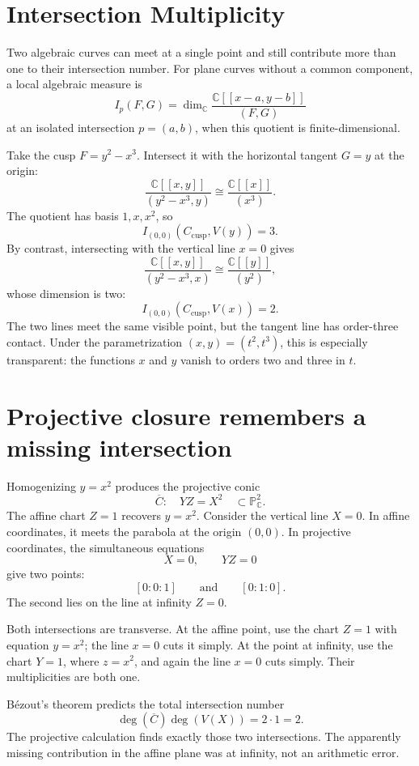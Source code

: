 \section{Intersection Multiplicity}

Two algebraic curves can meet at a single point and still contribute more than one to their intersection number. For plane curves without a common component, a local algebraic measure is
\[
 I_p(F,G)=\dim_{\mathbb C}
 \frac{\mathbb C[[x-a,y-b]]}{(F,G)}
\]
at an isolated intersection \(p=(a,b)\), when this quotient is finite-dimensional.

Take the cusp \(F=y^2-x^3\). Intersect it with the horizontal tangent \(G=y\) at the origin:
\[
 \frac{\mathbb C[[x,y]]}{(y^2-x^3,y)}
 \cong\frac{\mathbb C[[x]]}{(x^3)}.
\]
The quotient has basis \(1,x,x^2\), so
\[
 \boxed{I_{(0,0)}(C_{\mathrm{cusp}},V(y))=3.}
\]
By contrast, intersecting with the vertical line \(x=0\) gives
\[
 \frac{\mathbb C[[x,y]]}{(y^2-x^3,x)}
 \cong\frac{\mathbb C[[y]]}{(y^2)},
\]
whose dimension is two:
\[
 \boxed{I_{(0,0)}(C_{\mathrm{cusp}},V(x))=2.}
\]
The two lines meet the same visible point, but the tangent line has order-three contact. Under the parametrization \((x,y)=(t^2,t^3)\), this is especially transparent: the functions \(x\) and \(y\) vanish to orders two and three in \(t\).

\section{Projective closure remembers a missing intersection}

Homogenizing \(y=x^2\) produces the projective conic
\[
 \overline C:\quad YZ=X^2
 \quad\subset\mathbb P^2_{\mathbb C}.
\]
The affine chart \(Z=1\) recovers \(y=x^2\). Consider the vertical line \(X=0\). In affine coordinates, it meets the parabola at the origin \((0,0)\). In projective coordinates, the simultaneous equations
\[
 X=0,\qquad YZ=0
\]
give two points:
\[
 [0:0:1]\qquad\text{and}\qquad[0:1:0].
\]
The second lies on the line at infinity \(Z=0\).

Both intersections are transverse. At the affine point, use the chart \(Z=1\) with equation \(y=x^2\); the line \(x=0\) cuts it simply. At the point at infinity, use the chart \(Y=1\), where \(z=x^2\), and again the line \(x=0\) cuts simply. Their multiplicities are both one.

Bézout's theorem predicts the total intersection number
\[
 \deg(\overline C)\deg(V(X))=2\cdot1=2.
\]
The projective calculation finds exactly those two intersections. The apparently missing contribution in the affine plane was at infinity, not an arithmetic error.

